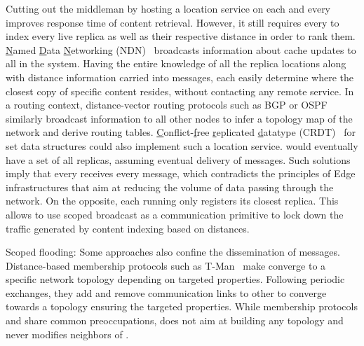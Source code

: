 \begin{asparadesc}
Cutting out the middleman by hosting a location service on each and
every \process improves response time of content retrieval. However,
it still requires every \process to index every live replica as well
as their respective distance in order to rank them.
\underline{N}amed \underline{D}ata \underline{N}etworking
(NDN)~\cite{nlsr} broadcasts information about cache updates to all
\nodes in the system. Having the entire knowledge of all the replica
locations along with distance information carried into messages, each
\node easily determine where the closest copy of specific content
resides, without contacting any remote
service. In a routing context, distance-vector routing protocols such as BGP or OSPF~\cite{ospf} similarly broadcast information to all other nodes to infer a topology map of the network and derive routing tables.
\underline{C}onflict-\underline{f}ree \underline{r}eplicated
\underline{d}atatype (CRDT)~\cite{shapiro2011crdts} for set data
structures could also implement such a location service. \Processes
would eventually have a set of all replicas, assuming eventual
delivery of messages.
\noindent Such solutions imply that every \process receives every
message, which contradicts the principles of Edge infrastructures that
aim at reducing the volume of data passing through the network. On the
opposite, each \process running \NAME only registers its closest
replica. This allows \NAME to use scoped broadcast as a communication
primitive to lock down the traffic generated by content indexing based
on distances.

\item [Scoped flooding:]
  Some approaches also confine the dissemination of messages.
\noindent Distance-based membership protocols such as
T-Man~\cite{t-man} make \processes converge to a specific network
topology depending on targeted properties. Following periodic
exchanges, they add and remove communication links to other \processes
to converge towards a topology ensuring the targeted properties.
While membership protocols and \NAME share common preoccupations,
\NAME does not aim at building any topology and never modifies
neighbors of \processes.



\end{asparadesc}
